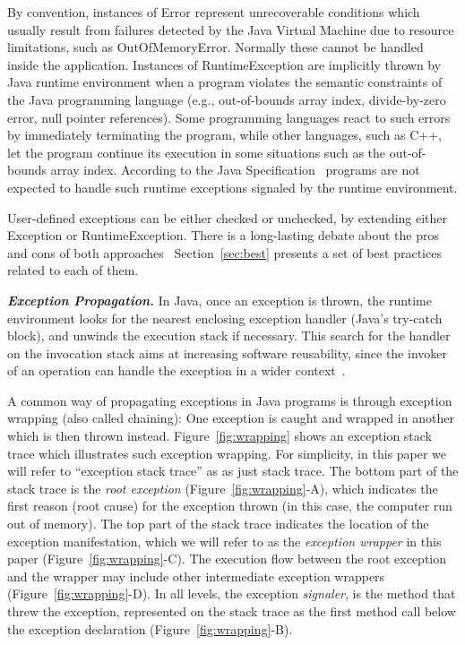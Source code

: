 By convention, instances of Error represent  unrecoverable conditions which usually result
from failures detected by the Java Virtual Machine due to resource limitations, such as OutOfMemoryError.
Normally these cannot be handled inside the application.  Instances of RuntimeException are implicitly 
thrown by Java runtime environment when a program violates 
the semantic constraints of the Java programming language (e.g., out-of-bounds array index, divide-by-zero 
error, null pointer references). Some programming languages react to such errors by immediately terminating the program, while
other languages, such as C++, let the program  continue
 its execution in some situations such as the out-of-bounds array index.
According to the Java Specification~\cite{gosling2000java} programs are not 
expected to handle such runtime exceptions signaled by the runtime environment. 

User-defined exceptions can be either checked
 or unchecked, by extending either Exception or RuntimeException. There is a long-lasting debate 
about the pros and cons of both approaches~\cite{javatut,stackoverlow,debate}
Section~\ref{sec:best} presents
a set of best practices related to each of them.

\emph{\textbf{Exception Propagation.}} In Java, once an exception is thrown, 
the runtime environment looks for the nearest enclosing exception handler
(Java's try-catch block), and unwinds the execution stack if necessary.
This search for the handler on the invocation stack aims at increasing software reusability, 
since the invoker of an operation can handle the exception in a wider context~\cite{miller1997issues}.

 A common way of  propagating exceptions in Java programs is through
 exception wrapping (also called chaining):
One exception 
is caught and wrapped in another which is then thrown instead. Figure~\ref{fig:wrapping} shows 
an exception stack trace which illustrates such exception wrapping. 
For simplicity, in this paper we will refer to ``exception stack trace'' as as just stack trace.
The bottom part of the stack trace is the \emph{root exception} (Figure~\ref{fig:wrapping}-A), which indicates
the first reason (root cause) for the exception thrown (in this case, the computer run out of
memory). The top part of the stack trace indicates the location of the exception
manifestation, which we will refer to as the \emph{exception wrapper} in this paper (Figure~\ref{fig:wrapping}-C). The
execution flow  between the root exception and the wrapper may
include other intermediate exception wrappers (Figure~\ref{fig:wrapping}-D). In all levels, the exception
\emph{signaler}, is the method that threw the exception, represented on the
stack trace as the first method call below the exception declaration (Figure~\ref{fig:wrapping}-B).

